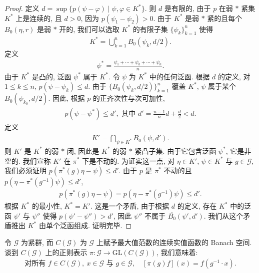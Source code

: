 \documentclass[../../main.tex]{subfiles}
\begin{document}
\begin{proof}
定义 $d=\sup\{p(\psi-\varphi)\mid\psi,\varphi\in K^{*}\}$. 则 $d$ 是有限的, 由于 $p$ 在弱 $*$ 紧集 $K^{*}$ 上是连续的, 且 $d>0$, 因为 $p(\psi_{1}-\psi_{2})>0$. 由于 $K^{*}$ 是弱 $*$ 紧的且每个 $B_{0}(\eta,r)$ 是弱 $*$ 开的, 我们可以选取 $K^{*}$ 的有限子集 $\{\psi_{k}\}_{k=1}^{n}$ 使得
\begin{align*}
K^{*}=\bigcup_{k=1}^{n}B_{0}(\psi_{k},d/2).
\end{align*}
定义
\begin{align*}
\psi^{*}=\frac{\psi_{1}+\cdots+\psi_{k}+\cdots+\psi_{n}}{n}.
\end{align*}
由于 $K^{*}$ 是凸的, 泛函 $\psi^{*}$ 属于 $K^{*}$. 令 $\psi$ 为 $K^{*}$ 中的任何泛函. 根据 $d$ 的定义, 对 $1\leqslant k\leqslant n$, $p(\psi-\psi_{k})\leqslant d$. 由于 $\{B_{0}(\psi_{k},d/2)\}_{k=1}^{n}$ 覆盖 $K^{*}$, $\psi$ 属于某个 $B_{0}(\psi_{k_{0}},d/2)$. 因此, 根据 $p$ 的正齐次性与次可加性,
\begin{align*}
p(\psi-\psi^{*})\leqslant d',\text{ 其中 }d'=\frac{n-1}{n}d+\frac{d}{2}<d.
\end{align*}
定义
\begin{align*}
K'=\bigcap_{\psi\in K^{*}}\overline{B_{0}}(\psi,d').
\end{align*}
则 $K'$ 是 $K^{*}$ 的弱 $*$ 闭, 因此是 $K^{*}$ 的弱 $*$ 紧凸子集. 由于它包含泛函 $\psi^{*}$, 它是非空的. 我们宣称 $K'$ 在 $\pi^{*}$ 下是不动的. 为证实这一点, 对 $\eta\in K'$, $\psi\in K^{*}$ 与 $g\in\mathcal{G}$, 我们必须证明 $p(\pi^{*}(g)\eta-\psi)\leqslant d'$. 由于 $p$ 是 $\pi^{*}$ 不动的且 $p(\eta-\pi^{*}(g^{-1})\psi)\leqslant d'$,
\begin{align*}
p(\pi^{*}(g)\eta-\psi)=p(\eta-\pi^{*}(g^{-1})\psi)\leqslant d'.
\end{align*}
根据 $K^{*}$ 的最小性, $K^{*}=K'$. 这是一个矛盾, 由于根据 $d$ 的定义, 存在 $K^{*}$ 中的泛函 $\psi'$ 与 $\psi''$ 使得 $p(\psi'-\psi'')>d'$, 因此 $\psi''$ 不属于 $\overline{B_{0}}(\psi',d')$. 我们从这个矛盾推出 $K^{*}$ 由单个泛函组成. 证明完毕.
\end{proof}

\begin{definition}[正则表示]\label{definition:ch22-regular-rep}
令 $\mathcal{G}$ 为紧群, 而 $C(\mathcal{G})$ 为 $\mathcal{G}$ 上赋予最大值范数的连续实值函数的 Banach 空间. 谈到 $C(\mathcal{G})$ 上的正则表示 $\pi:\mathcal{G}\to\mathrm{GL}(C(\mathcal{G}))$, 我们意味着:
\begin{align*}
\text{对所有 }f\in C(\mathcal{G}),\ x\in\mathcal{G}\text{ 与 }g\in\mathcal{G},\quad[\pi(g)f](x)=f(g^{-1}\cdot x).
\end{align*}
\end{definition}
\end{document}
